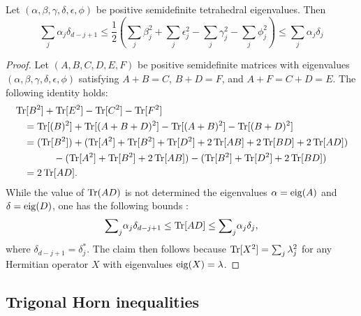 \documentclass[notitlepage, 10pt]{article}
\begin{document}
\begin{prop}
    \label{prop:simple_quadratic}
    Let $(\alpha,\beta,\gamma,\delta,\epsilon,\phi)$ be positive semidefinite tetrahedral eigenvalues.
    Then
    \begin{equation}
        {\sum}_{j}\alpha_j\delta_{d-j+1} \leq \frac{1}{2}\left({\sum}_{j}\beta_j^2 + {\sum}_{j}\epsilon_j^2 - {\sum}_{j}\gamma_j^2 -{\sum}_{j}\phi_j^2\right) \leq {\sum}_{j}\alpha_j\delta_j
    \end{equation}
\end{prop}
\begin{proof}
    Let $(A,B,C,D,E,F)$ be positive semidefinite matrices 
    with eigenvalues $(\alpha,\beta,\gamma,\delta,\epsilon,\phi)$
    satisfying $A+B=C$, $B+D=F$, and $A+F=C+D=E$.
    The following identity holds:
    \begin{align}
        \begin{split}
            & \operatorname{Tr}[B^2] + \operatorname{Tr}[E^2] - \operatorname{Tr}[C^2] - \operatorname{Tr}[F^2] \\
            &\quad=\operatorname{Tr}[(B)^2] + \operatorname{Tr}[(A+B+D)^2] - \operatorname{Tr}[(A+B)^2] - \operatorname{Tr}[(B+D)^2] \\
            &\quad= 
            (\operatorname{Tr}[B^2])
            +(\operatorname{Tr}[A^2] + \operatorname{Tr}[B^2] + \operatorname{Tr}[D^2] + 2\operatorname{Tr}[AB] + 2\operatorname{Tr}[BD] + 2 \operatorname{Tr}[AD])\\
            &\qquad\qquad-(\operatorname{Tr}[A^2] + \operatorname{Tr}[B^2] + 2\operatorname{Tr}[AB])
            -(\operatorname{Tr}[B^2] + \operatorname{Tr}[D^2] + 2\operatorname{Tr}[BD])\\
            &\quad= 2 \operatorname{Tr}[AD].
        \end{split}
    \end{align}
    While the value of $\operatorname{Tr}(AD)$ is not determined the eigenvalues $\alpha = \operatorname{eig}(A)$ and $\delta = \operatorname{eig}(D)$, one has the following bounds \cite[H.1.g \& H.1.h]{marshall2010inequalities}:
    \begin{equation}
        {\sum}_{j} \alpha_j \delta_{d-j+1} \leq \operatorname{Tr}[AD] \leq {\sum}_{j} \alpha_j \delta_j,
    \end{equation} 
    where $\delta_{d-j+1} = \delta^{*}_j$. 
    The claim then follows because $\operatorname{Tr}[X^2] = \sum_{j}\lambda_{j}^2$ for any Hermitian operator $X$ with eigenvalues $\operatorname{eig}(X) = \lambda$.
\end{proof}

\subsection{Trigonal Horn inequalities}
\label{sec:horn_ineqs}
\end{document}
